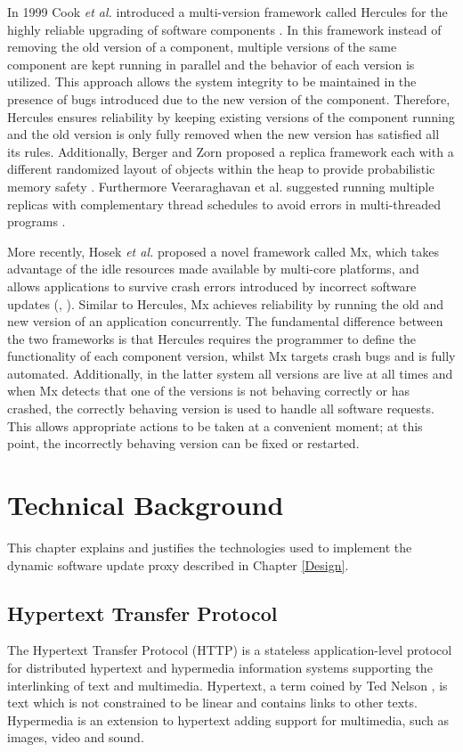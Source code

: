 \documentclass[a4paper,11pt,twoside]{report}
\begin{document}
In 1999 Cook \textit{et al.} introduced a multi-version framework called Hercules for the highly reliable upgrading of software components \cite{Cook}. In this framework instead of removing the old version of a component, multiple versions of the same component are kept running in parallel and the behavior of each version is utilized. This approach allows the system integrity to be maintained in the presence of bugs introduced due to the new version of the component. Therefore, Hercules ensures reliability by keeping existing versions of the component running and the old version is only fully removed when the new version has satisfied all its rules. Additionally, Berger and Zorn proposed a replica framework each with a different randomized layout of objects within the heap to provide probabilistic memory safety \cite{Berger}. Furthermore Veeraraghavan et al. suggested running multiple replicas with complementary thread schedules to avoid errors in multi-threaded programs \cite{Veeraraghavan}. 

More recently, Hosek \textit{et al.} proposed a novel framework called Mx, which takes advantage of the idle resources made available by multi-core platforms, and allows applications to survive crash errors introduced by incorrect software updates (\cite{Cadar1}, \cite{Cadar2}). Similar to Hercules, Mx achieves reliability by running the old and new version of an application concurrently. The fundamental difference between the two frameworks is that Hercules requires the programmer to define the functionality of each component version, whilst Mx targets crash bugs and is fully automated. Additionally, in the latter system all versions are live at all times and when Mx detects that one of the versions is not behaving correctly or has crashed, the correctly behaving version is used to handle all software requests. This allows appropriate actions to be taken at a convenient moment; at this point, the incorrectly behaving version can be fixed or restarted. 
\clearpage

\chapter{Technical Background}
This chapter explains and justifies the technologies used to implement the dynamic software update proxy described in Chapter \ref{Design}.

\section{Hypertext Transfer Protocol} \label{HTTP}
The Hypertext Transfer Protocol (HTTP) is a stateless application-level protocol for distributed hypertext and hypermedia information systems supporting the interlinking of text and multimedia.  Hypertext, a term coined by Ted Nelson \cite{hypertext}, is text which is not constrained to be linear and contains links to other texts.  Hypermedia is an extension to hypertext adding support for multimedia, such as images, video and sound.
\end{document}

